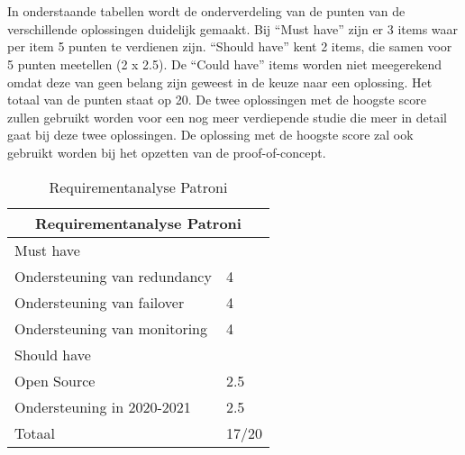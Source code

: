 \section{}
\label{sec:Resultatenanalyse}


\subsection{}
\label{subsec:Resultaten requirements}

In onderstaande tabellen wordt de onderverdeling van de punten van de verschillende oplossingen duidelijk gemaakt. Bij “Must have” zijn er 3 items waar per item 5 punten te verdienen zijn. “Should have” kent 2 items, die samen voor 5 punten meetellen (2 x 2.5). De “Could have” items worden niet meegerekend omdat deze van geen belang zijn geweest in de keuze naar een oplossing. Het totaal van de punten staat op 20. De twee oplossingen met de hoogste score zullen gebruikt worden voor een nog meer verdiepende studie die meer in detail gaat bij deze twee oplossingen. De oplossing met de hoogste score zal ook gebruikt worden bij het opzetten van de proof-of-concept.

\begin{table}[!h]
\begin{tabular}{ |p{6cm}||p{6cm}|  }
    \hline
    \multicolumn{2}{|c|}{Requirementanalyse Patroni} \\
    \hline
    Must have & \\
    \hline
    Ondersteuning van redundancy  & 4 \\
    Ondersteuning van failover &  4 \\
    Ondersteuning van monitoring & 4 \\
    \hline
    Should have & \\
    \hline
   Open Source &  2.5 \\
   Ondersteuning in 2020-2021 & 2.5 \\
    \hline
    \hline
    Totaal & 17/20 \\
    \hline
\end{tabular}
\caption{Requirementanalyse Patroni}
\label{table:Requirementanalyse Patroni}
\end{table}


